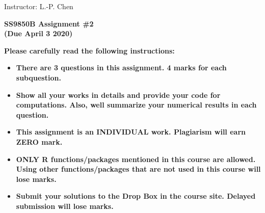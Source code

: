 \documentclass[11pt]{article}
\begin{document}
\hfill Instructor: L.-P. Chen

\begin{center}
\Large{\bf SS9850B Assignment \#2 
\\(Due April 3 2020)}
\end{center}

{\bf Please carefully read the following instructions:}

\begin{itemize}

\item {\bf There are 3 questions in this assignment. 4 marks for each subquestion.}

\item  {\bf Show all your works in details and provide your code for computations. Also, well summarize your numerical results in each question.}

\item {\bf This assignment is an INDIVIDUAL work. Plagiarism will earn ZERO mark.}

\item {\bf ONLY R functions/packages mentioned in this course are allowed.  Using other functions/packages that are not used in this course will lose marks.}


\item {\bf Submit your solutions to the Drop Box in the course site. Delayed submission will lose marks.}

\end{itemize}

\clearpage
\end{document}
